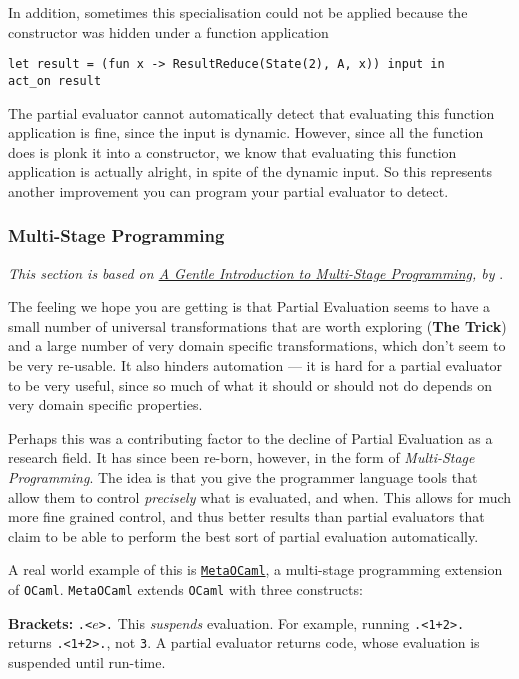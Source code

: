 In addition, sometimes this specialisation could not be applied because the constructor was hidden under a function application
\begin{verbatim}
let result = (fun x -> ResultReduce(State(2), A, x)) input in
act_on result
\end{verbatim}
The partial evaluator cannot automatically detect that evaluating this function application is fine, since the input is dynamic. However, since all the function does is plonk it into a constructor, we know that evaluating this function application is actually alright, in spite of the dynamic input. So this represents another improvement you can program your partial evaluator to detect.

\subsubsection{Multi-Stage Programming}
\textit{This section is based on \href{https://link.springer.com/chapter/10.1007/978-3-540-25935-0_3}{A Gentle Introduction to Multi-Stage Programming}, by} \citet{taha-2004}.

The feeling we hope you are getting is that Partial Evaluation seems to have a small number of universal transformations that are worth exploring (\textbf{The Trick}) and a large number of very domain specific transformations, which don't seem to be very re-usable. It also hinders automation --- it is hard for a partial evaluator to be very useful, since so much of what it should or should not do depends on very domain specific properties.

Perhaps this was a contributing factor to the decline of Partial Evaluation as a research field. It has since been re-born, however, in the form of \textit{Multi-Stage Programming}. The idea is that you give the programmer language tools that allow them to control \textit{precisely} what is evaluated, and when. This allows for much more fine grained control, and thus better results than partial evaluators that claim to be able to perform the best sort of partial evaluation automatically. 

A real world example of this is \href{https://okmij.org/ftp/ML/MetaOCaml.html}{\texttt{MetaOCaml}}, a multi-stage programming extension of \texttt{OCaml}. \texttt{MetaOCaml} extends \texttt{OCaml} with three constructs:

\textbf{Brackets:} \texttt{.<$e$>.} This \textit{suspends} evaluation. For example, running \texttt{.<1+2>.} returns \texttt{.<1+2>.}, not \texttt{3}. A partial evaluator returns code, whose evaluation is suspended until run-time.

